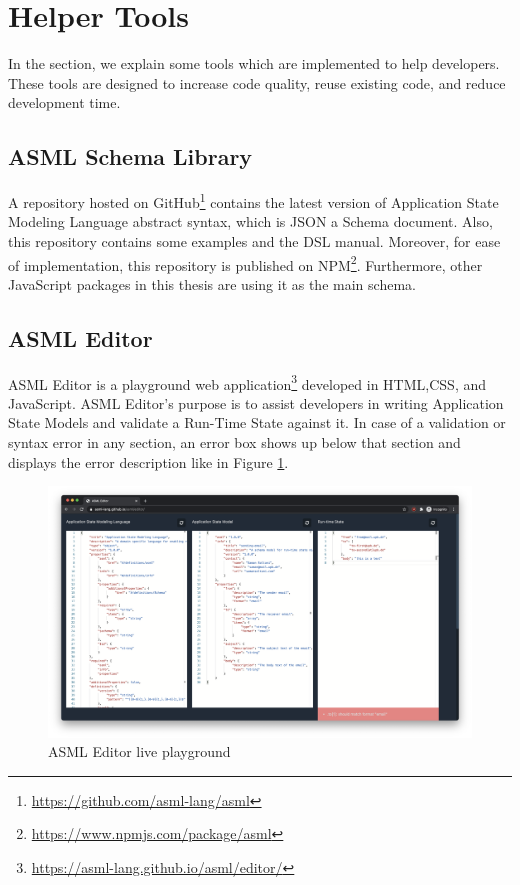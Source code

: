 \section{Helper Tools}
In the section, we explain some tools which are implemented to help developers. These tools are designed to increase code quality, reuse existing code, and reduce development time.
\subsection{ASML Schema Library}
A repository hosted on GitHub\footnote{\url{https://github.com/asml-lang/asml}} contains the latest version of Application State Modeling Language abstract syntax, which is JSON a Schema document. Also, this repository contains some examples and the DSL manual. Moreover, for ease of implementation, this repository is published on NPM\footnote{\url{https://www.npmjs.com/package/asml}}. Furthermore, other JavaScript packages in this thesis are using it as the main schema.
 

\subsection{ASML Editor}
ASML Editor is a playground web application\footnote{\url{https://asml-lang.github.io/asml/editor/}} developed in HTML,CSS, and JavaScript. ASML Editor's purpose is to assist developers in writing Application State Models and validate a Run-Time State against it. In case of a validation or syntax error in any section, an error box shows up below that section and displays the error description like in Figure \ref{fig:asml-editor}. 
\FloatBarrier \begin{figure}[H]
    \includegraphics[width=\linewidth]{../figures/asml-editor.png}
    \centering
    \caption{ASML Editor live playground}
    \label{fig:asml-editor}
\end{figure} \FloatBarrier

